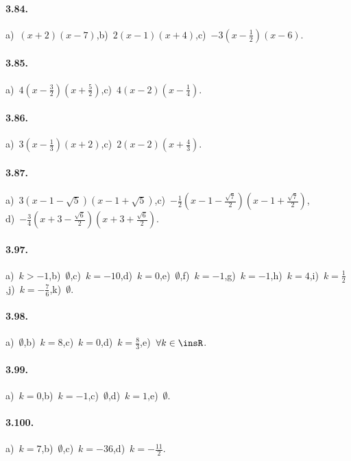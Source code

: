 \paragraph{3.84.} a)~$(x + 2) (x-7)$,\quad b)~$2 (x-1) (x + 4)$,\quad c)~$- 3 \left(x-\frac{1}{2} \right) (x-6)$.

\paragraph{3.85.} a)~$4 \left(x-\frac{3}{2} \right) \left(x + \frac{5}{2} \right)$,\quad c)~$4 (x-2) \left(x-\frac{1}{4} \right)$.

\paragraph{3.86.} a)~$3 \left(x-\frac{1}{3} \right) (x + 2)$,\quad c)~$2 (x-2) \left(x + \frac{4}{3} \right)$.

\paragraph{3.87.} a)~$3 \left(x-1-\sqrt{5} \right) \left(x-1 + \sqrt{5} \right)$,\quad c)~$- \frac{1}{2} \left(x-1-\frac{\sqrt{7}}{2} \right) \left(x- 1 + \frac{\sqrt{7}}{2} \right)$,\protect\\\quad d)~$- \frac{3}{4} \left(x + 3-\frac{\sqrt{6}}{2} \right) \left(x+ 3 + \frac{\sqrt{6}}{2} \right)$.

\paragraph{3.97.} a)~$k >-1$,\quad b)~$\emptyset$,\quad c)~$k =-10$,\quad d)~$k = 0$,\quad e)~$ \emptyset $,\quad f)~$ k =-1 $,\quad g)~$ k =-1 $,\quad h)~$ k = 4 $,\quad i)~$ k = \frac{1}{2} $,\quad j)~$ k =-\frac{7}{6} $,\quad k)~$\emptyset$.

\paragraph{3.98.} a)~$\emptyset $,\quad b)~$k = 8 $,\quad c)~$ k = 0$,\quad d)~$k = \frac{8}{3} $,\quad e)~$\forall k \in \insR$.

\paragraph{3.99.} a)~$ k = 0 $,\quad b)~$ k =-1 $,\quad c)~$ \emptyset $,\quad d)~$ k = 1 $,\quad e)~$ \emptyset $.

\paragraph{3.100.} a)~$ k = 7 $,\quad b)~$ \emptyset $,\quad c)~$ k =-36 $,\quad d)~$ k =-\frac{11}{2} $.

